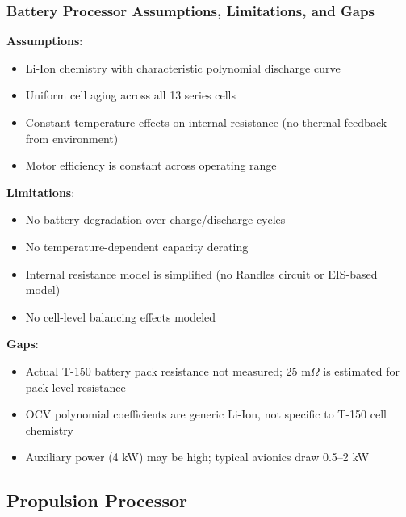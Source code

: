 \subsubsection{\unclass Battery Processor Assumptions, Limitations, and Gaps}\label{sec:BatteryALG}

\unclass \textbf{Assumptions}:
\begin{itemize}
	\item \unclass Li-Ion chemistry with characteristic polynomial discharge curve
	\item \unclass Uniform cell aging across all 13 series cells
	\item \unclass Constant temperature effects on internal resistance (no thermal feedback from environment)
	\item \unclass Motor efficiency is constant across operating range
\end{itemize}

\unclass \textbf{Limitations}:
\begin{itemize}
	\item \unclass No battery degradation over charge/discharge cycles
	\item \unclass No temperature-dependent capacity derating
	\item \unclass Internal resistance model is simplified (no Randles circuit or EIS-based model)
	\item \unclass No cell-level balancing effects modeled
\end{itemize}

\unclass \textbf{Gaps}:
\begin{itemize}
	\item \unclass Actual T-150 battery pack resistance not measured; 25 m$\Omega$ is estimated for pack-level resistance
	\item \unclass OCV polynomial coefficients are generic Li-Ion, not specific to T-150 cell chemistry
	\item \unclass Auxiliary power (4 kW) may be high; typical avionics draw 0.5--2 kW
\end{itemize}

\pagebreak


\subsection{\unclass Propulsion Processor}\label{sec:PropulsionProcessor}

